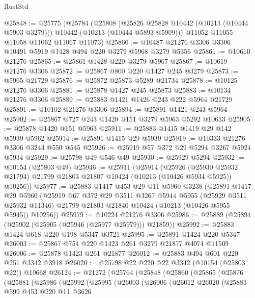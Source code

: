 \begin{lexlean}{RustStd}
\begin{coremodule}
{\begin{coremodule}
{{{{{{{{{{{{{{{{{{{{{{{{{{@25848 := @25775
    (@25784
      (@25808
        (@25826 @25828 @10442 (@10213 (@10444 @5903 @3279)))
        @10442
        (@10213 (@10444 @5893 @5909)))
      @11052
      @11055
      @11058
      @11062
      @11067
      @11073)
@25860 := @10487 @21276 @3306 @3306 @10491 @5919 @1428 @494 @220 @3279 @5968 @3279 @5356
@25861 := @10610 @21276
@25865 := @25861 @1428 @220 @3279 @5967
@25867 := @10619 @21276 @3306
@25872 := @25867 @800 @220 @1427 @245 @3279
@25873 := @5965 @21729
@25876 := @25872 @25873 @5289 @21734
@25878 := @10125 @21276 @3306
@25881 := @25878 @1427 @245 @25873
@25883 := @10134 @21276 @3306
@25889 := @25883 @1421 @1426 @243 @222 @5964 @21729
@25891 := @10102 @21276 @3306
@25894 := @25891 @1421 @243 @5964
@25902 := @25867 @727 @243 @1420 @151 @3279 @5963 @5292 @10633
@25905 := @25878 @1420 @151 @5963
@25911 := @25883 @1415 @1419 @29 @142 @5939 @5962
@25914 := @25891 @1415 @29 @5939
@25919 := @10333 @21276 @3306 @3244 @550 @545
@25926 := @25919 @57 @372 @29 @5294 @3267 @5924 @5934
@25929 := @25798 @49 @546 @49
@25930 := @25929 @5294
@25932 := @10154 (@25803 @49)
@25946 := @25911
    (@25914
      (@25926
        (@25930 @25932 @21794)
        @21799
        @21803
        @21807
        @10424
        (@10213 (@10426 @5934 @5925))
        @10256))
@25977 := @25883
    @1417
    @453
    @29
    @11
    @5960
    @3238
    (@25891
      @1417
      @29
      @5960
      (@25919
        @67
        @372
        @29
        @3511
        @3267
        @5944
        @5955
        (@25929 @3511 @25932 @11346)
        @21799
        @21803
        @21840
        @10424
        (@10213 (@10426 @5955 @5945))
        @10256))
@25979 := @10224 @21276 @3306
@25986 := @25889 (@25894 (@25902 (@25905 (@25946 (@25977 @25979))) @21859))
@25992 := @25883 @1424 @618 @220 @198 @5347 @3721
@25995 := @25891 @1424 @220 @5347
@26003 := @25867 @754 @220 @1423 @261 @3279 @21877 @4074 @11509
@26006 := @25878 @1423 @261 @21877
@26012 := @25883 @494 @601 @220 @251 @3342 @3918
@26020 := @25798 @22 @220 @22 @3342 (@10154 (@25803 @22)) @10668
@26124 := @21272
    (@25764
      (@25848
        (@25860
          (@25865
            (@25876
              (@25881
                (@25986
                  (@25992
                    (@25995
                      (@26003
                        (@26006
                          (@26012
                            @26020
                            (@25883
                              @599
                              @453
                              @220
                              @11
                              @3626
}}}}}}}}}}}}}}}}}}}}}}}}}}
\end{coremodule}}
\end{coremodule}
\end{lexlean}
